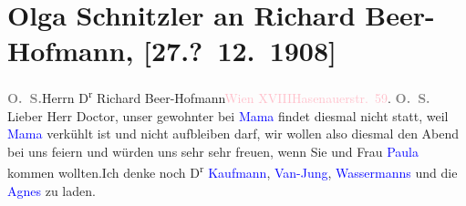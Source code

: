 

               \section[Olga Schnitzler an Richard Beer-Hofmann, {[}27.? 12. 1908{]}]{ Olga Schnitzler an Richard Beer-Hofmann, {[}27.? 12. 1908{]}}\nopagebreak{}\rehead{ }\normalsize\beginnumbering{} \toendnotes[C]{\smallbreak\pagebreak[2]} 
\toendnotes[C]{\smallbreak}\pstart{}{\pb}\textcolor{gray}{\textbf{O. S.}}\pend{}{\bigskip}\pstart{}{\pb}Herrn D\textsuperscript{r} Richard
                  Beer-Hofmann\pend{}\pstart{}\textcolor{pink}{Wien XVIII}{}\ledrightnote{\textcolor{pink}{XVIII., Währing}}\pend{}\pstart{}\textcolor{pink}{Hasenauerstr. 59}{}\ledrightnote{\textcolor{pink}{Hasenauerstraße}}.\pend{}{\bigskip}\pstart
           \noindent{}{\pb}\textcolor{gray}{\textbf{O. S.}}\pend
           \pstart
           Lieber Herr Doctor, unser gewohnter \label{K_L01819_1v}\label{K_L01819_1h} bei \textcolor{blue}{Mama}{} findet diesmal
               nicht statt, weil \textcolor{blue}{Mama}{} verkühlt
               ist und nicht aufbleiben darf, wir wollen also diesmal den Abend bei uns feiern und
               würden uns sehr sehr freuen, wenn Sie und Frau \textcolor{blue}{Paula}{}\ledrightnote{\textcolor{blue}{Paula Beer-Hofmann}}
               kommen wollten.\hspace*{1.5em}Ich denke noch {\pb}D\textsuperscript{r}{ }\textcolor{blue}{Kaufmann}{}\ledrightnote{\textcolor{blue}{Arthur Kaufmann}}, \textcolor{blue}{Van-Jung}{}\ledrightnote{\textcolor{blue}{Leo Van-Jung}}, \textcolor{blue}{Wassermanns}{}\ledrightnote{\textcolor{blue}{Jakob Wassermann}{\newline}\textcolor{blue}{Julie Wassermann}} und die \textcolor{blue}{Agnes}{}\ledrightnote{\textcolor{blue}{Agnes Ulmann}} zu laden.\pend
